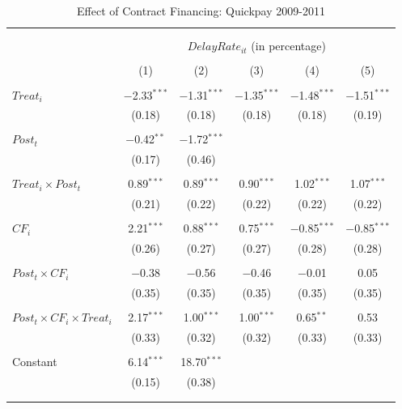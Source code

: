 \documentclass[
]{article}
\begin{document}
\begin{table}[H] \centering 
  \caption{Effect of Contract Financing: Quickpay 2009-2011} 
  \label{} 
\small 
\begin{tabular}{@{\extracolsep{-2pt}}lccccc} 
\\[-1.8ex]\hline 
\hline \\[-1.8ex] 
\\[-1.8ex] & \multicolumn{5}{c}{$DelayRate_{it}$ (in percentage)} \\ 
\\[-1.8ex] & (1) & (2) & (3) & (4) & (5)\\ 
\hline \\[-1.8ex] 
 $Treat_i$ & $-$2.33$^{***}$ & $-$1.31$^{***}$ & $-$1.35$^{***}$ & $-$1.48$^{***}$ & $-$1.51$^{***}$ \\ 
  & (0.18) & (0.18) & (0.18) & (0.18) & (0.19) \\ 
  & & & & & \\ 
 $Post_t$ & $-$0.42$^{**}$ & $-$1.72$^{***}$ &  &  &  \\ 
  & (0.17) & (0.46) &  &  &  \\ 
  & & & & & \\ 
 $Treat_i \times Post_t$ & 0.89$^{***}$ & 0.89$^{***}$ & 0.90$^{***}$ & 1.02$^{***}$ & 1.07$^{***}$ \\ 
  & (0.21) & (0.22) & (0.22) & (0.22) & (0.22) \\ 
  & & & & & \\ 
 $CF_i$ & 2.21$^{***}$ & 0.88$^{***}$ & 0.75$^{***}$ & $-$0.85$^{***}$ & $-$0.85$^{***}$ \\ 
  & (0.26) & (0.27) & (0.27) & (0.28) & (0.28) \\ 
  & & & & & \\ 
 $Post_t \times CF_i$ & $-$0.38 & $-$0.56 & $-$0.46 & $-$0.01 & 0.05 \\ 
  & (0.35) & (0.35) & (0.35) & (0.35) & (0.35) \\ 
  & & & & & \\ 
 $Post_t \times CF_i \times Treat_i$ & 2.17$^{***}$ & 1.00$^{***}$ & 1.00$^{***}$ & 0.65$^{**}$ & 0.53 \\ 
  & (0.33) & (0.32) & (0.32) & (0.33) & (0.33) \\ 
  & & & & & \\ 
 Constant & 6.14$^{***}$ & 18.70$^{***}$ &  &  &  \\ 
  & (0.15) & (0.38) &  &  &  \\ 
  & & & & & \\ 
\hline \\[-1.8ex] 

\end{tabular}
\end{table}
\end{document}
